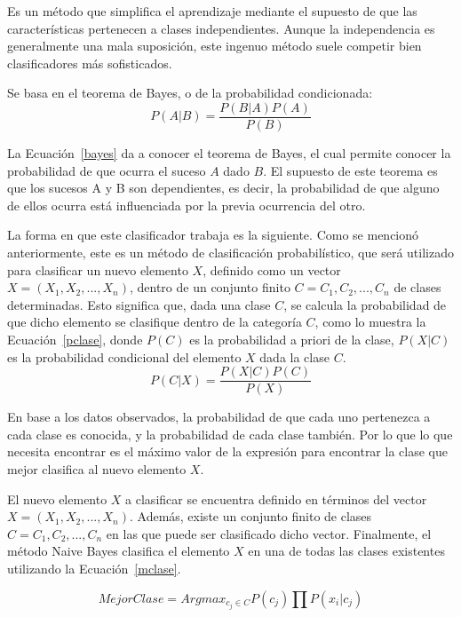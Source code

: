 \begin{enumerate}
\begin{description}
      Es un método que simplifica el aprendizaje mediante el supuesto de que las características pertenecen a clases independientes. Aunque la independencia es generalmente una mala suposición, este ingenuo método suele competir bien  clasificadores más sofisticados.
      
      Se basa en el teorema de Bayes, o de la probabilidad condicionada: 
      \begin{equation}\label{bayes}
      P(A|B)=\frac{P(B|A) P(A)}{P(B)}
      \end{equation}
      
      La Ecuación~\ref{bayes} da a conocer el teorema de Bayes, el cual permite conocer la probabilidad de que ocurra el suceso $A$ dado $B$. El supuesto de este teorema es que los sucesos A y B son dependientes, es decir, la probabilidad de que alguno de ellos ocurra está influenciada por la previa ocurrencia del otro.
      
      La forma en que este clasificador trabaja es la siguiente. Como se mencionó anteriormente, este es un método de clasificación probabilístico, que será utilizado para clasificar un nuevo elemento $X$, definido como un vector $X=(X_1, X_2, ..., X_n)$, dentro de un conjunto finito $C={C_1, C_2, ..., C_n}$ de clases determinadas. Esto significa que, dada una clase $C$, se calcula la probabilidad de que dicho elemento se clasifique dentro de la categoría $C$, como lo muestra la Ecuación~\ref{pclase}, donde $P(C)$ es la probabilidad a priori de la clase, $P(X|C)$ es la probabilidad condicional del elemento $X$ dada la clase $C$.
      \begin{equation}\label{pclase}
      P(C|X)=\frac{P(X|C) P(C)}{P(X)}
      \end{equation}
      
      En base a los datos observados, la probabilidad de que cada uno pertenezca a cada clase es conocida, y la probabilidad de cada clase también. Por lo que lo que necesita encontrar es el máximo valor de la expresión para encontrar la clase que mejor clasifica al nuevo elemento $X$. 
      
      El nuevo elemento $X$ a clasificar se encuentra definido en términos del vector $X=(X_1, X_2, ..., X_n)$. Además, existe un conjunto finito de clases $C={C_1, C_2, ..., C_n}$ en las que puede ser clasificado dicho vector. Finalmente, el método Naive Bayes clasifica el elemento $X$ en una de todas las clases existentes utilizando la Ecuación~\ref{mclase}.

      \begin{equation}\label{mclase}
      Mejor Clase = Argmax_{c_j\in C} P(c_j) \prod P(x_i|c_j)
      \end{equation}
      

\end{description}
\end{enumerate}
